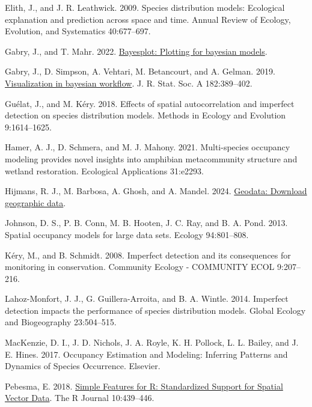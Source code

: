 \documentclass[
  11pt,
  a4paper,
]{article}
\newlength{\cslhangindent}
\newenvironment{CSLReferences}[2] %
 {\begin{list}{}{%
  \setlength{\itemindent}{0pt}
  \setlength{\leftmargin}{0pt}
  \setlength{\parsep}{0pt}
  \ifodd #1
   \setlength{\leftmargin}{\cslhangindent}
   \setlength{\itemindent}{-1\cslhangindent}
  \fi
  \setlength{\itemsep}{#2\baselineskip}}}
 {\end{list}}
\begin{document}
\begin{CSLReferences}{1}{0}
Elith, J., and J. R. Leathwick. 2009. Species distribution models: Ecological explanation and prediction across space and time. Annual Review of Ecology, Evolution, and Systematics 40:677--697.

Gabry, J., and T. Mahr. 2022. \href{https://mc-stan.org/bayesplot/}{Bayesplot: Plotting for bayesian models}.

Gabry, J., D. Simpson, A. Vehtari, M. Betancourt, and A. Gelman. 2019. \href{https://doi.org/10.1111/rssa.12378}{Visualization in bayesian workflow}. J. R. Stat. Soc. A 182:389--402.

Guélat, J., and M. Kéry. 2018. Effects of spatial autocorrelation and imperfect detection on species distribution models. Methods in Ecology and Evolution 9:1614--1625.

Hamer, A. J., D. Schmera, and M. J. Mahony. 2021. Multi-species occupancy modeling provides novel insights into amphibian metacommunity structure and wetland restoration. Ecological Applications 31:e2293.

Hijmans, R. J., M. Barbosa, A. Ghosh, and A. Mandel. 2024. \href{https://CRAN.R-project.org/package=geodata}{Geodata: Download geographic data}.

Johnson, D. S., P. B. Conn, M. B. Hooten, J. C. Ray, and B. A. Pond. 2013. Spatial occupancy models for large data sets. Ecology 94:801--808.

Kéry, M., and B. Schmidt. 2008. Imperfect detection and its consequences for monitoring in conservation. Community Ecology - COMMUNITY ECOL 9:207--216.

Lahoz-Monfort, J. J., G. Guillera-Arroita, and B. A. Wintle. 2014. Imperfect detection impacts the performance of species distribution models. Global Ecology and Biogeography 23:504--515.

MacKenzie, D. I., J. D. Nichols, J. A. Royle, K. H. Pollock, L. L. Bailey, and J. E. Hines. 2017. Occupancy {Estimation} and {Modeling}: {Inferring Patterns} and {Dynamics} of {Species Occurrence}. {Elsevier}.

Pebesma, E. 2018. \href{https://doi.org/10.32614/RJ-2018-009}{{Simple Features for R: Standardized Support for Spatial Vector Data}}. {The R Journal} 10:439--446.


\end{CSLReferences}
\end{document}
